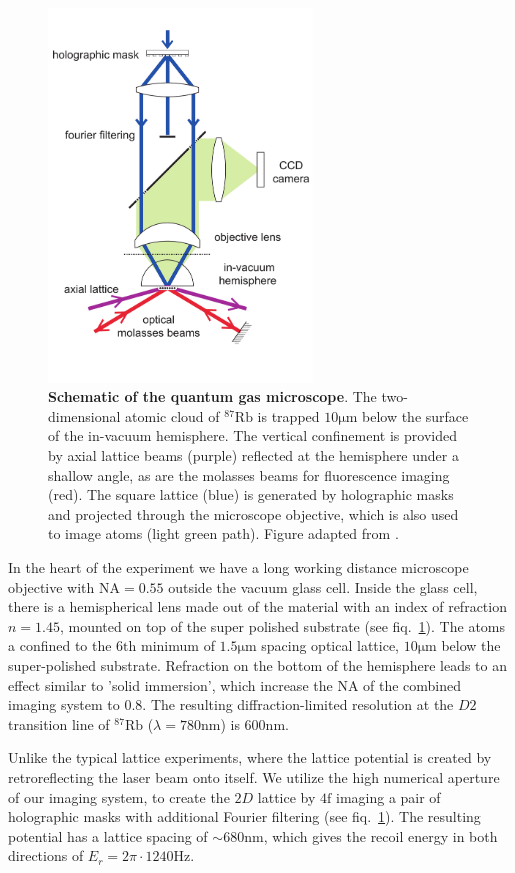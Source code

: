 \begin{figure}[t]
	\centering
	\includegraphics[width=70mm]{figures/QGM_setup.pdf}
	\caption{{\bf Schematic of the quantum gas microscope}. The two-dimensional atomic cloud of $^{87}\mathrm{Rb}$ is trapped $10\mathrm{\mu m}$ below the surface of the in-vacuum hemisphere. The vertical confinement is provided by axial lattice beams (purple) reflected at the hemisphere under a shallow angle, as are the molasses beams for fluorescence imaging (red). The square lattice (blue) is generated by holographic masks and projected through the microscope objective, which is also used to image atoms (light green path). Figure adapted from \cite{Bakr2009}.}
	\label{fig:QGM_QGM}
\end{figure}

In the heart of the experiment we have a long working distance microscope objective with $\textrm{NA} = 0.55$ outside the vacuum glass cell. Inside the glass cell, there is a hemispherical lens made out of the material with an index of refraction $n=1.45$, mounted on top of the super polished substrate (see fiq.~\ref{fig:QGM_QGM}). The atoms a confined to the $6\mathrm{th}$ minimum of $1.5\mathrm{\mu m}$ spacing optical lattice, $10\mathrm{\mu m}$ below the super-polished substrate. Refraction on the bottom of the hemisphere leads to an effect similar to 'solid immersion', which increase the NA of the combined imaging system to $0.8$. The resulting diffraction-limited resolution at the $D2$ transition line of $^{87}\mathrm{Rb}$ ($\lambda = 780\mathrm{nm}$) is $600\mathrm{nm}$. 

Unlike the typical lattice experiments, where the lattice potential is created by retroreflecting the laser beam onto itself. We utilize the high numerical aperture of our imaging system, to create the $2D$ lattice by $4\mathrm{f}$ imaging a pair of holographic masks with additional Fourier filtering (see fiq.~\ref{fig:QGM_QGM}). The resulting potential has a lattice spacing of $\sim 680\mathrm{nm}$, which gives the recoil energy in both directions of $E_r = 2\pi \cdot 1240\mathrm{Hz}$.

